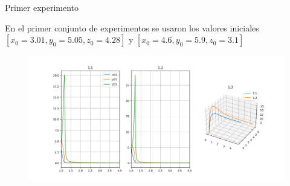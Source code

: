 \documentclass{beamer}
\begin{document}
\begin{frame}
    {Primer experimento}

    En el primer conjunto de experimentos se usaron los valores iniciales $[x_0=3.01, y_0=5.05, z_0=4.28]$
    y $[x_0=4.6, y_0=5.9, z_0=3.1]$

    \begin{figure}[h!]
        \includegraphics[width=\linewidth]{../numerical_models/images/1.png}
    \end{figure}
\end{frame}
\end{document}
